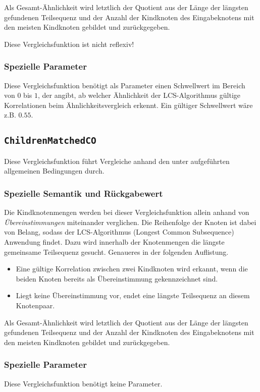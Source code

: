 Als Gesamt-Ähnlichkeit wird letztlich der Quotient aus der Länge der längsten gefundenen Teilsequenz und der Anzahl der Kindknoten des Eingabeknotens mit den meisten Kindknoten gebildet und zurückgegeben.

 Diese Vergleichsfunktion ist nicht reflexiv!

\subsubsection*{Spezielle Parameter}
Diese Vergleichsfunktion benötigt als Parameter einen Schwellwert im Bereich von $0$ bis $1$, der angibt, ab welcher Ähnlichkeit der LCS-Algorithmus gültige Korrelationen beim Ähnlichkeitsvergleich erkennt. Ein gültiger Schwellwert wäre z.B. $0.55$.


%
%
\subsection{\texttt{ChildrenMatchedCO}}
Diese Vergleichsfunktion führt Vergleiche anhand den unter  aufgeführten allgemeinen Bedingungen durch.

\subsubsection*{Spezielle Semantik und Rückgabewert}
Die Kindknotenmengen werden bei dieser Vergleichsfunktion allein anhand von \emph{Übereinstimmungen} miteinander verglichen. Die Reihenfolge der Knoten ist dabei von Belang, sodass der LCS-Algorithmus (Longest Common Subsequence) Anwendung findet. Dazu wird innerhalb der Knotenmengen die längste gemeinsame Teilsequenz gesucht. Genaueres in der folgenden Auflistung.
\begin{itemize}
	\item Eine gültige Korrelation zwischen zwei Kindknoten wird erkannt, wenn die beiden Knoten bereits als Übereinstimmung gekennzeichnet sind.
	\item Liegt keine Übereinstimmung vor, endet eine längste Teilsequenz an diesem Knotenpaar.
\end{itemize}

Als Gesamt-Ähnlichkeit wird letztlich der Quotient aus der Länge der längsten gefundenen Teilsequenz und der Anzahl der Kindknoten des Eingabeknotens mit den meisten Kindknoten gebildet und zurückgegeben.

\subsubsection*{Spezielle Parameter}
Diese Vergleichsfunktion benötigt keine Parameter.


